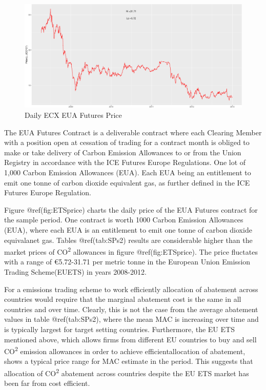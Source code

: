 \documentclass[
  10pt,
]{article}
\begin{document}
\begin{figure}[H]
\includegraphics{figures/paper-ETSprice-1} \caption{Daily ECX EUA Futures Price}\label{fig:ETSprice}
\end{figure}

\begin{footnotesize} The EUA Futures Contract is a deliverable contract where each Clearing Member with a position open at cessation of trading for a contract month is obliged to make or take delivery of Carbon Emission Allowances to or from the Union Registry in accordance with the ICE Futures Europe Regulations. One lot of 1,000 Carbon Emission Allowances (EUA). Each EUA being an entitlement to emit one tonne of carbon dioxide equivalent gas, as further defined in the ICE Futures Europe Regulation.
\end{footnotesize}

Figure @ref(fig:ETSprice) charts the daily price of the EUA Futures
contract for the sample period. One contract is worth 1000 Carbon
Emission Allowances (EUA), where each EUA is an entitlement to emit one
tonne of carbon dioxide equivalanet gas. Tables @ref(tab:SPs2) results
are considerable higher than the market prices of CO\textsuperscript{2}
allowances in figure @ref(fig:ETSprice). The price fluctates with a
range of €5.72-31.71 per metric tonne in the European Union Emission
Trading Scheme(EUETS) in years 2008-2012.

For a emissions trading scheme to work efficiently allocation of
abatement across countries would require that the marginal abatement
cost is the same in all countries and over time. Clearly, this is not
the case from the average abatement values in table @ref(tab:SPs2),
where the mean MAC is increasing over time and is typically largest for
target setting countries. Furthermore, the EU ETS mentioned above, which
allows firms from different EU countries to buy and sell
CO\textsuperscript{2} emission allowances in order to achieve
efficientallocation of abatement, shows a typical price range for MAC
estimate in the period. This suggests that allocation of
CO\textsuperscript{2} abatement across countries despite the EU ETS
market has been far from cost efficient.
\end{document}
